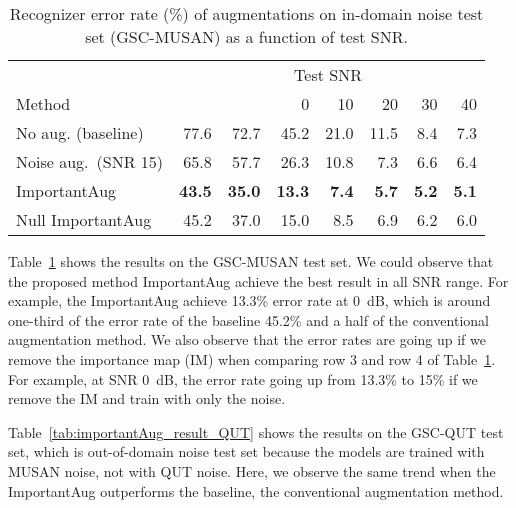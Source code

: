 \documentclass{article}
\begin{document}
\begin{table}
  \caption{Recognizer error rate (\%) of augmentations on in-domain noise test set (GSC-MUSAN) as a function of test SNR.}\label{tab:importantAug_result_MUSAN}
  \begin{center}
  \scriptsize
    \begin{tabular}{lrrrrrrr}
    \toprule
    & \multicolumn{7}{c}{Test SNR} \\
     Method &   & &0 & 10 & 20 & 30 &40 \\
     \midrule
     No aug. (baseline) & 77.6 & 72.7 & 45.2 & 21.0 & 11.5 & 8.4 & 7.3 \\
       Noise aug.~(SNR 15) & 65.8 & 57.7 & 26.3 & 10.8 & 7.3 & 6.6 & 6.4  \\
        ImportantAug & \textbf{43.5} & \textbf{35.0} & \textbf{13.3} & \textbf{7.4} & \textbf{5.7} & \textbf{5.2} & \textbf{5.1}   \\
        Null ImportantAug & 45.2 & 37.0 & 15.0 & 8.5 & 6.9 & 6.2 & 6.0  \\
      \bottomrule
    \end{tabular}
  \end{center}
\end{table}











Table~\ref{tab:importantAug_result_MUSAN} shows the results on the GSC-MUSAN test set. We could observe that the proposed method ImportantAug achieve the best result in all SNR range. For example, the ImportantAug achieve 13.3\% error rate at 0~dB, which is around one-third of the error rate of the baseline 45.2\% and a half of the conventional augmentation method. We also observe that the error rates are going up if we remove the importance map (IM) when comparing row 3 and row 4 of Table~\ref{tab:importantAug_result_MUSAN}. For example, at SNR 0~dB, the error rate going up from 13.3\% to 15\% if we remove the IM and train with only the noise.  


Table~\ref{tab:importantAug_result_QUT} shows the results on the GSC-QUT test set, which is out-of-domain noise test set because the models are trained with MUSAN noise, not with QUT noise. Here, we observe the same trend when the ImportantAug outperforms the baseline, the conventional augmentation method.
\end{document}
